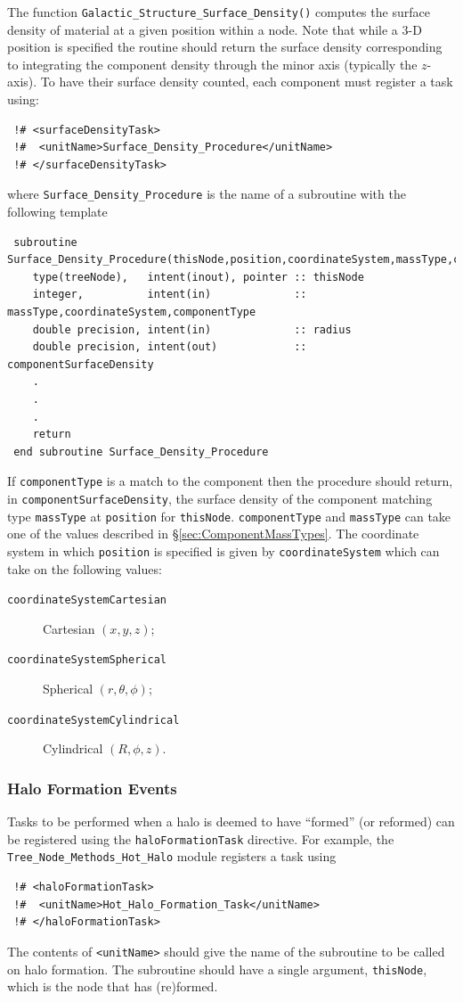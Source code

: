 The function {\tt Galactic\_Structure\_Surface\_Density()} computes the surface density of material at a given position within a node. Note that while a 3-D position is specified the routine should return the surface density corresponding to integrating the component density through the minor axis (typically the $z$-axis). To have their surface density counted, each component must register a task using:
\begin{verbatim}
 !# <surfaceDensityTask>
 !#  <unitName>Surface_Density_Procedure</unitName>
 !# </surfaceDensityTask>
\end{verbatim}
where {\tt Surface\_Density\_Procedure} is the name of a subroutine with the following template
\begin{verbatim}
 subroutine Surface_Density_Procedure(thisNode,position,coordinateSystem,massType,componentType,componentSurfaceDensity)
    type(treeNode),   intent(inout), pointer :: thisNode
    integer,          intent(in)             :: massType,coordinateSystem,componentType
    double precision, intent(in)             :: radius
    double precision, intent(out)            :: componentSurfaceDensity
    .
    .
    .
    return
 end subroutine Surface_Density_Procedure
\end{verbatim}
If {\tt componentType} is a match to the component then the procedure should return, in {\tt componentSurfaceDensity}, the surface density of the component matching type {\tt massType} at {\tt position} for {\tt thisNode}. {\tt componentType} and {\tt massType} can take one of the values described in \S\ref{sec:ComponentMassTypes}.
The coordinate system in which {\tt position} is specified is given by {\tt coordinateSystem} which can take on the following values:
\begin{description}
 \item [{\tt coordinateSystemCartesian}] Cartesian $(x,y,z)$;
 \item [{\tt coordinateSystemSpherical}] Spherical $(r,\theta,\phi)$;
 \item [{\tt coordinateSystemCylindrical}] Cylindrical $(R,\phi,z)$.
\end{description}

\subsubsection{Halo Formation Events}\label{sec:HaloFormationEvents}

Tasks to be performed when a halo is deemed to have ``formed'' (or reformed) can be registered using the {\tt haloFormationTask} directive. For example, the {\tt Tree\_Node\_Methods\_Hot\_Halo} module registers a task using
\begin{verbatim}
 !# <haloFormationTask>
 !#  <unitName>Hot_Halo_Formation_Task</unitName>
 !# </haloFormationTask>
\end{verbatim}
The contents of {\tt <unitName>} should give the name of the subroutine to be called on halo formation. The subroutine should have a single argument, {\tt thisNode}, which is the node that has (re)formed.

